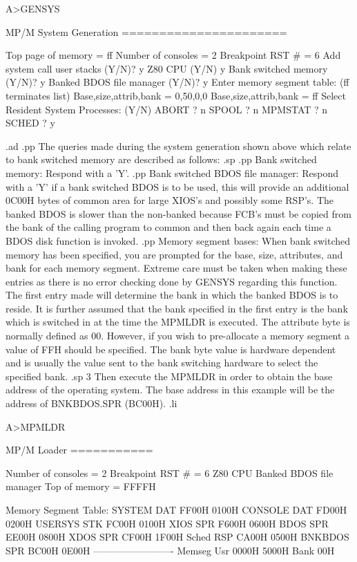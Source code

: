 	A>GENSYS

	MP/M System Generation
	======================

	Top page of memory = ff
	Number of consoles = 2
	Breakpoint RST #   = 6
	Add system call user stacks (Y/N)? y
	Z80 CPU (Y/N) y
	Bank switched memory (Y/N)? y
	Banked BDOS file manager (Y/N)? y
	Enter memory segment table: (ff terminates list)
	 Base,size,attrib,bank = 0,50,0,0
	 Base,size,attrib,bank = ff
	Select Resident System Processes: (Y/N)
	ABORT    ? n
	SPOOL    ? n
	MPMSTAT  ? n
	SCHED    ? y

.ad
.pp
The queries made during the system generation shown above
which relate to bank switched memory are described as follows:
.sp
.pp
Bank switched memory:  Respond with a 'Y'.
.pp
Bank switched BDOS file manager:  Respond with a 'Y' if
a bank switched BDOS is to be used, this will provide an additional
0C00H bytes of common area for large XIOS's and possibly some
RSP's.
The banked BDOS is slower than the non-banked because FCB's must
be copied from the bank of the calling program to common and then
back again each time a BDOS disk function is invoked.
.pp
Memory segment bases:  When bank switched memory has been
specified, you are prompted for the base, size, attributes, and
bank for each memory segment.
Extreme care must be taken when making these entries as there is
no error checking done by GENSYS regarding this function.  The first
entry made will determine the bank in which the banked BDOS is to
reside.  It is further assumed that the bank specified in the first
entry is the bank which is switched in at the time the MPMLDR is
executed.
The attribute byte is normally defined as 00.   However, if 
you  wish  to pre-allocate a memory segment a value of  FFH 
should  be  specified.   The bank byte  value  is  hardware 
dependent  and  is  usually  the value  sent  to  the  bank 
switching hardware to select the specified bank.
.sp 3
Then execute the MPMLDR in order to obtain the base address of
the operating system.  The base address in this example will be
the address of BNKBDOS.SPR (BC00H).
.li

	A>MPMLDR

	MP/M Loader
	===========

	Number of consoles =  2
	Breakpoint RST #   =  6
	Z80 CPU
	Banked BDOS file manager
	Top of memory      =  FFFFH

	Memory Segment Table:
	SYSTEM  DAT  FF00H  0100H
	CONSOLE DAT  FD00H  0200H
	USERSYS STK  FC00H  0100H
	XIOS    SPR  F600H  0600H
	BDOS    SPR  EE00H  0800H
	XDOS    SPR  CF00H  1F00H
	Sched   RSP  CA00H  0500H
	BNKBDOS SPR  BC00H  0E00H
	-------------------------
	Memseg  Usr  0000H  5000H  Bank 00H


